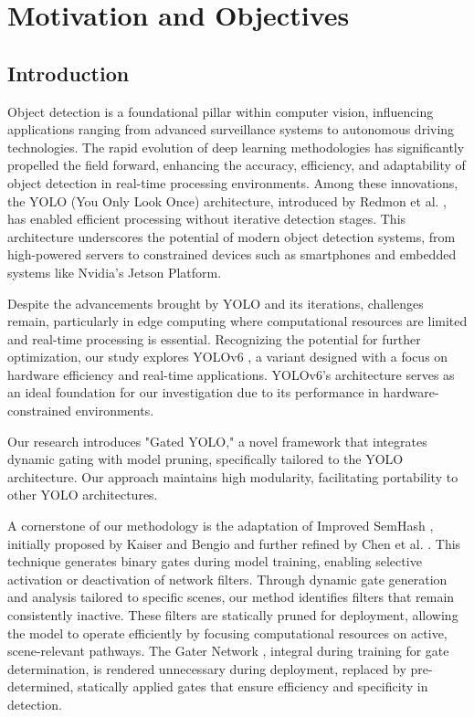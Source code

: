 \section{Motivation and Objectives}  

\subsection{Introduction}

Object detection is a foundational pillar within computer vision, influencing applications ranging from advanced surveillance systems to autonomous driving technologies. The rapid evolution of deep learning methodologies has significantly propelled the field forward, enhancing the accuracy, efficiency, and adaptability of object detection in real-time processing environments. Among these innovations, the YOLO (You Only Look Once) architecture, introduced by Redmon et al. \cite{redmon2016you}, has enabled efficient processing without iterative detection stages. This architecture underscores the potential of modern object detection systems, from high-powered servers to constrained devices such as smartphones and embedded systems like Nvidia's Jetson Platform.

Despite the advancements brought by YOLO and its iterations, challenges remain, particularly in edge computing where computational resources are limited and real-time processing is essential. Recognizing the potential for further optimization, our study explores YOLOv6 \cite{li2022yolov6,li2023yolov6}, a variant designed with a focus on hardware efficiency and real-time applications. YOLOv6's architecture \cite{li2022yolov6,li2023yolov6} serves as an ideal foundation for our investigation due to its performance in hardware-constrained environments.

Our research introduces "Gated YOLO," a novel framework that integrates dynamic gating with model pruning, specifically tailored to the YOLO architecture. Our approach maintains high modularity, facilitating portability to other YOLO architectures.

A cornerstone of our methodology is the adaptation of Improved SemHash \cite{kaiser2018discrete}, initially proposed by Kaiser and Bengio and further refined by Chen et al. \cite{chen2019you}. This technique generates binary gates during model training, enabling selective activation or deactivation of network filters. Through dynamic gate generation and analysis tailored to specific scenes, our method identifies filters that remain consistently inactive. These filters are statically pruned for deployment, allowing the model to operate efficiently by focusing computational resources on active, scene-relevant pathways. The Gater Network \cite{chen2019you}, integral during training for gate determination, is rendered unnecessary during deployment, replaced by pre-determined, statically applied gates that ensure efficiency and specificity in detection.


